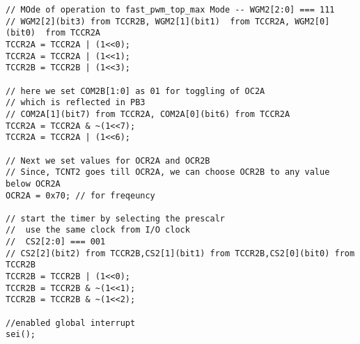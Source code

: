 \documentclass{article}
\begin{document}
\begin{verbatim}
// MOde of operation to fast_pwm_top_max Mode -- WGM2[2:0] === 111
// WGM2[2](bit3) from TCCR2B, WGM2[1](bit1)  from TCCR2A, WGM2[0](bit0)  from TCCR2A
TCCR2A = TCCR2A | (1<<0);
TCCR2A = TCCR2A | (1<<1);
TCCR2B = TCCR2B | (1<<3);	

// here we set COM2B[1:0] as 01 for toggling of OC2A
// which is reflected in PB3
// COM2A[1](bit7) from TCCR2A, COM2A[0](bit6) from TCCR2A
TCCR2A = TCCR2A & ~(1<<7);
TCCR2A = TCCR2A | (1<<6);

// Next we set values for OCR2A and OCR2B
// Since, TCNT2 goes till OCR2A, we can choose OCR2B to any value below OCR2A
OCR2A = 0x70; // for freqeuncy

// start the timer by selecting the prescalr
//  use the same clock from I/O clock
//  CS2[2:0] === 001
// CS2[2](bit2) from TCCR2B,CS2[1](bit1) from TCCR2B,CS2[0](bit0) from TCCR2B
TCCR2B = TCCR2B | (1<<0);
TCCR2B = TCCR2B & ~(1<<1);
TCCR2B = TCCR2B & ~(1<<2);

//enabled global interrupt
sei();
\end{verbatim}
\end{document}
